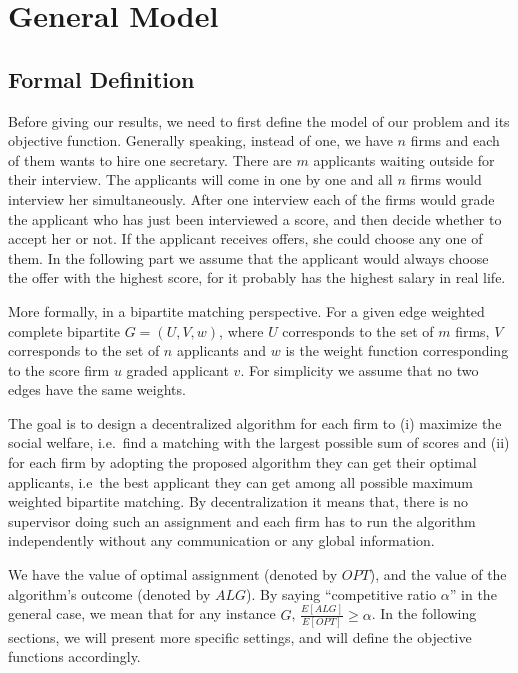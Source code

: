 \chapter{General Model}\label{chap:general}

\section{Formal Definition}

Before giving our results, we need to first define the model
of our problem and its objective function.
Generally speaking, instead of one, we have $n$ firms and each of them
wants to hire one secretary. There are $m$ applicants waiting outside
for their interview. The applicants will come in one by one and all
$n$ firms would interview her simultaneously. After one interview each
of the firms would grade the applicant who has just been interviewed
a score, and then decide whether to accept her or not. If the applicant
receives offers, she could choose any one of them.
In the following part we assume that the applicant would always choose the
offer with the highest score, for it probably has the highest salary
in real life.

More formally, in a bipartite matching perspective.
For a given edge weighted complete bipartite $G = (U, V, w)$,
where $U$ corresponds to the set of $m$ firms, 
$V$ corresponds to the set of $n$ applicants
and $w$ is the weight function corresponding to the score firm $u$
graded applicant $v$.
For simplicity we assume that no two edges have the same weights.

The goal is to design a decentralized algorithm for each firm to
(i) maximize the social welfare, i.e.\ find a matching with the 
largest possible sum of scores and (ii) for each firm by adopting the
proposed algorithm they can get their optimal applicants,
i.e\ the best applicant they can get among all possible maximum weighted
bipartite matching. By decentralization it means that, there is no
supervisor doing such an assignment and each firm has
to run the algorithm independently without any communication or
any global information.

We have the value of optimal assignment (denoted by $OPT$), 
and the value of the algorithm's outcome (denoted by $ALG$).
By saying ``competitive ratio $\alpha$'' in the general case, 
we mean that for any instance $G$, $\frac{E[ALG]}{E[OPT]} \ge \alpha$.
In the following sections, we will present more specific settings, 
and will define the objective functions accordingly.

